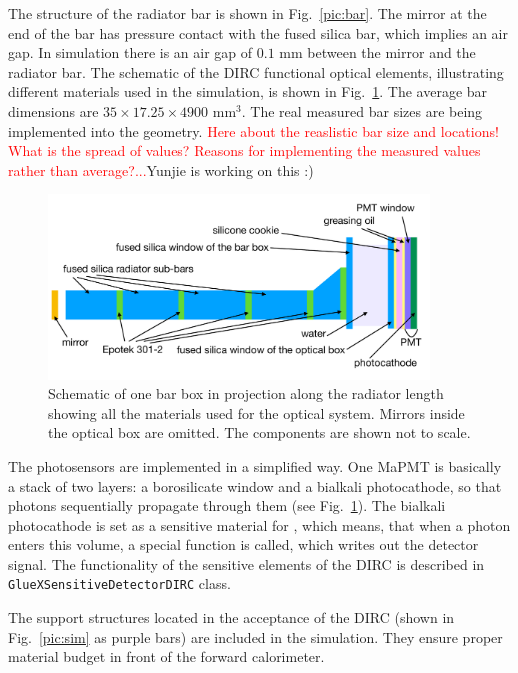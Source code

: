 The structure of the radiator bar is shown in Fig.~\ref{pic:bar}. The mirror at the end of the bar has pressure contact with the fused silica bar, which implies an air gap. In simulation there is an air gap of $0.1$ mm between the mirror and the radiator bar. The schematic of the \gluex DIRC functional optical elements, illustrating different materials used in the simulation, is shown in Fig.~\ref{pic:struct}. 
The average bar dimensions are $35 \times 17.25 \times 4900 $ mm$^3$. The real measured bar sizes are being implemented into the geometry. 
\textcolor{red}{Here about the reaslistic bar size and locations! What is the spread of values? Reasons for implementing the measured values rather than average?...}Yunjie is working on this :) 

\begin{figure}[!h]
\centering
\includegraphics[angle=0,width=0.9\textwidth]{pics/struct3.pdf}
\caption{\label{pic:struct}
Schematic of one bar box in projection along the radiator length showing all the materials used for the optical system. Mirrors inside the optical box are omitted. The components are shown not to scale.
}
\end{figure}

The photosensors are implemented in a simplified way. One MaPMT is basically a stack of two layers: a borosilicate window and a bialkali photocathode, so that photons sequentially propagate through them (see Fig.~\ref{pic:struct}). The bialkali photocathode is set as a sensitive material for , which means, that when a photon enters this volume, a special function is called, which writes out the detector signal. The functionality of the sensitive elements of the \gluex DIRC is described in \texttt{GlueXSensitiveDetectorDIRC} class.

The support structures located in the acceptance of the DIRC (shown in Fig.~\ref{pic:sim} as purple bars) are included in the simulation. They ensure proper material budget in front of the forward calorimeter.
